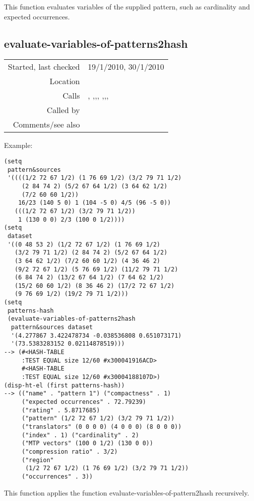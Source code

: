 \noindent This function evaluates variables of the
supplied pattern, such as cardinality and expected
occurrences.


\subsection*{evaluate-variables-of-patterns2hash}\label{fun:evaluate-variables-of-patterns2hash}

\vspace{0.3cm}
\begin{tabular}{r|p{8cm}}
Started, last checked & 19/1/2010, 30/1/2010 \\
Location & \nameref{sec:evaluation-for-SIACT} \\
Calls & \nameref{fun:collect-indices-and-ratings}, \nameref{fun:constant-vector},\newline \nameref{fun:empirical-mass},\newline \nameref{fun:evaluate-variables-of-pattern2hash}, \nameref{fun:nth-list},\newline \nameref{fun:nth-list-of-lists},\newline \nameref{fun:orthogonal-projection-not-unique-equalp}, \nameref{fun:sort-by} \\
Called by & \\
Comments/see also &
\end{tabular}

\vspace{0.5cm}
\noindent Example:
\begin{verbatim}
(setq
 pattern&sources
 '((((1/2 72 67 1/2) (1 76 69 1/2) (3/2 79 71 1/2)
     (2 84 74 2) (5/2 67 64 1/2) (3 64 62 1/2)
     (7/2 60 60 1/2))
    16/23 (140 5 0) 1 (104 -5 0) 4/5 (96 -5 0))
   (((1/2 72 67 1/2) (3/2 79 71 1/2))
    1 (130 0 0) 2/3 (100 0 1/2))))
(setq
 dataset
 '((0 48 53 2) (1/2 72 67 1/2) (1 76 69 1/2)
   (3/2 79 71 1/2) (2 84 74 2) (5/2 67 64 1/2) 
   (3 64 62 1/2) (7/2 60 60 1/2) (4 36 46 2)
   (9/2 72 67 1/2) (5 76 69 1/2) (11/2 79 71 1/2)
   (6 84 74 2) (13/2 67 64 1/2) (7 64 62 1/2)
   (15/2 60 60 1/2) (8 36 46 2) (17/2 72 67 1/2)
   (9 76 69 1/2) (19/2 79 71 1/2)))
(setq
 patterns-hash
 (evaluate-variables-of-patterns2hash
  pattern&sources dataset
  '(4.277867 3.422478734 -0.038536808 0.651073171)
  '(73.5383283152 0.02114878519)))
--> (#<HASH-TABLE
     :TEST EQUAL size 12/60 #x300041916ACD>
     #<HASH-TABLE
     :TEST EQUAL size 12/60 #x30004188107D>)
(disp-ht-el (first patterns-hash))
--> (("name" . "pattern 1") ("compactness" . 1)
     ("expected occurrences" . 72.79239)
     ("rating" . 5.8717685)
     ("pattern" (1/2 72 67 1/2) (3/2 79 71 1/2))
     ("translators" (0 0 0 0) (4 0 0 0) (8 0 0 0))
     ("index" . 1) ("cardinality" . 2)
     ("MTP vectors" (100 0 1/2) (130 0 0))
     ("compression ratio" . 3/2)
     ("region"
      (1/2 72 67 1/2) (1 76 69 1/2) (3/2 79 71 1/2))
     ("occurrences" . 3))
\end{verbatim}

\noindent This function applies the function
evaluate-variables-of-pattern2hash recursively.























